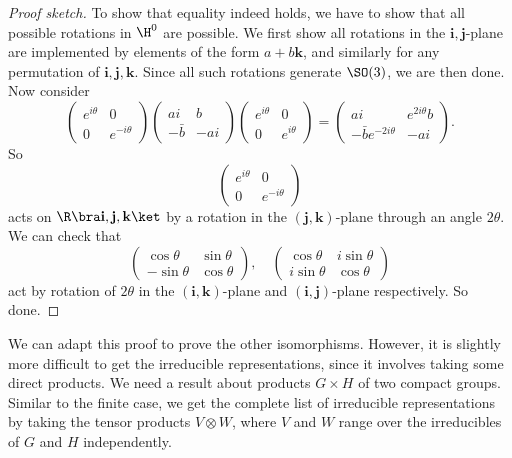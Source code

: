 \documentclass[a4paper]{article}
\begin{document}
\begin{proof}[Proof sketch]
  To show that equality indeed holds, we have to show that all possible rotations in $\H^0$ are possible. We first show all rotations in the $\mathbf{i},\mathbf{j}$-plane are implemented by elements of the form $a + b\mathbf{k}$, and similarly for any permutation of $\mathbf{i}, \mathbf{j}, \mathbf{k}$. Since all such rotations generate $\SO(3)$, we are then done. Now consider
  \[
    \begin{pmatrix}
      e^{i\theta} & 0\\
      0 & e^{-i\theta}
    \end{pmatrix}
    \begin{pmatrix}
      ai & b\\
      -\bar{b} & -ai
    \end{pmatrix}
    \begin{pmatrix}
      e^{i\theta} & 0\\
      0 & e^{i\theta}
    \end{pmatrix}
    =
    \begin{pmatrix}
      ai & e^{2i\theta}b\\
      -\bar{b} e^{-2i\theta} & -ai
    \end{pmatrix}.
  \]
  So
  \[
    \begin{pmatrix}
      e^{i\theta} & 0\\
      0 & e^{-i\theta}
    \end{pmatrix}
  \]
  acts on $\R\bra \mathbf{i}, \mathbf{j}, \mathbf{k}\ket$ by a rotation in the $(\mathbf{j}, \mathbf{k})$-plane through an angle $2\theta$. We can check that
  \[
    \begin{pmatrix}
      \cos \theta & \sin \theta\\
      -\sin \theta & \cos \theta
    \end{pmatrix},\quad
    \begin{pmatrix}
      \cos \theta & i \sin \theta\\
      i\sin \theta & \cos \theta
    \end{pmatrix}
  \]
  act by rotation of $2\theta$ in the $(\mathbf{i}, \mathbf{k})$-plane and $(\mathbf{i}, \mathbf{j})$-plane respectively. So done.
\end{proof}

We can adapt this proof to prove the other isomorphisms. However, it is slightly more difficult to get the irreducible representations, since it involves taking some direct products. We need a result about products $G \times H$ of two compact groups. Similar to the finite case, we get the complete list of irreducible representations by taking the tensor products $V \otimes W$, where $V$ and $W$ range over the irreducibles of $G$ and $H$ independently.
\end{document}
